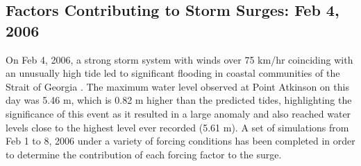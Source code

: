 \documentclass[pdftex,10pt]{article}
\begin{document}


\subsection{Factors Contributing to Storm Surges: Feb 4, 2006}

On Feb 4, 2006, a strong storm system with winds over 75 km/hr coinciding with an unusually high tide led to significant flooding in coastal communities of the Strait of Georgia \citep{romanowski2010storm}. The maximum water level observed at Point Atkinson on this day was 5.46 m, which is 0.82 m higher than the predicted tides, highlighting the significance of this event as it resulted in a large anomaly and also reached water levels close to the highest level ever recorded (5.61 m). A set of simulations from Feb 1 to 8, 2006 under a variety of forcing conditions has been completed in order to determine the contribution of each forcing factor to the surge.
\end{document}

